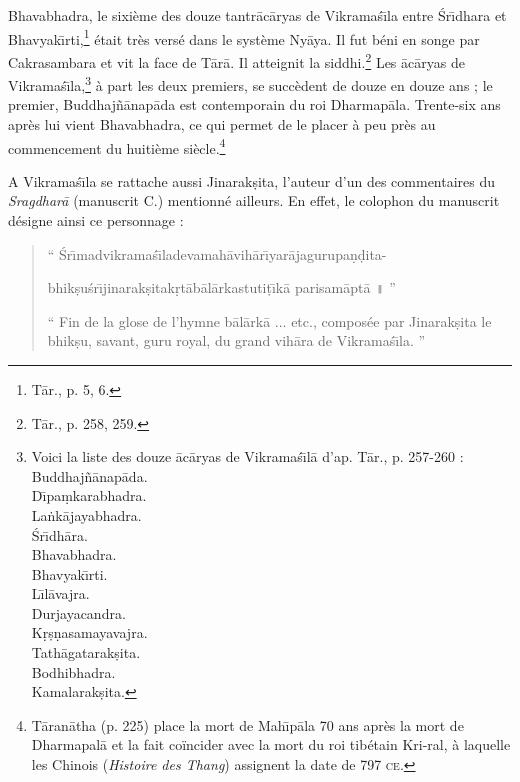 \documentclass[a4paper, 11pt, oneside, french]{article}
\begin{document}
Bhavabhadra, le sixième des douze tantr\={a}c\={a}ryas de Vikrama\'{s}\={\i}la entre \'{S}r\={\i}dhara et Bhavyak\={\i}rti,\footnote{T\={a}r., p. 5, 6.} était très versé dans le système Ny\={a}ya. Il fut béni en songe par Cakrasambara et vit la face de T\={a}r\={a}. Il atteignit la siddhi.\footnote{T\={a}r., p. 258, 259.} Les \={a}c\={a}ryas de Vikrama\'{s}\={\i}la,\footnote{Voici la liste des douze \={a}c\={a}ryas de Vikrama\'{s}\={\i}l\={a} d'ap. T\={a}r., p. 257-260 :\\\hspace*{10mm}Buddhaj\~{n}\={a}nap\={a}da.\\\hspace*{10mm}D\={\i}pa\d{m}karabhadra.\\\hspace*{10mm}La\.{n}k\={a}jayabhadra.\\\hspace*{10mm}\'{S}r\={\i}dh\={a}ra.\\\hspace*{10mm}Bhavabhadra.\\\hspace*{10mm}Bhavyak\={\i}rti.\\\hspace*{10mm}L\={\i}l\={a}vajra.\\\hspace*{10mm}Durjayacandra.\\\hspace*{10mm}K\d{r}\d{s}\d{n}asamayavajra.\\\hspace*{10mm}Tath\={a}gatarak\d{s}ita.\\\hspace*{10mm}Bodhibhadra.\\\hspace*{10mm}Kamalarak\d{s}ita.} à part les deux premiers, se succèdent de douze en douze ans ; le premier, Buddhaj\~{n}\={a}nap\={a}da est contemporain du roi Dharmap\={a}la. Trente-six ans après lui vient Bhavabhadra, ce qui permet de le placer à peu près au commencement du huitième siècle.\footnote{T\={a}ran\={a}tha (p. 225) place la mort de Mah\={\i}p\={a}la 70 ans après la mort de Dharmapal\={a} et la fait coïncider avec la mort du roi tibétain Kri-ral, à laquelle les Chinois (\emph{Histoire des Thang}) assignent la date de 797 \textsc{ce}.}

A Vikrama\'{s}\={\i}la se rattache aussi Jinarak\d{s}ita, l'auteur d'un des commentaires du \emph{Sragdhar\={a}} (manuscrit C.) mentionné ailleurs. En effet, le colophon du manuscrit désigne ainsi ce personnage :
\begin{quotation}
`` \'{S}r\={\i}madvikrama\'{s}\={\i}ladevamah\={a}vih\={a}r\={\i}yar\={a}jagurupa\d{n}\d{d}ita-

bhik\d{s}u\'{s}r\={\i}jinarak\d{s}itak\d{r}t\={a}b\={a}l\={a}rkastuti\d{t}\={\i}k\={a} parisam\={a}pt\={a} \texthindi{॥} ''

\bigskip

`` Fin de la glose de l'hymne b\={a}l\={a}rk\={a} ... etc., composée par Jinarak\d{s}ita le bhik\d{s}u, savant, guru royal, du grand vih\={a}ra de Vikrama\'{s}\={\i}la. ''
\end{quotation}
\end{document}
